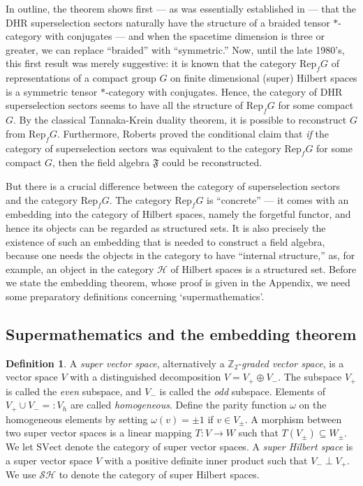 \documentclass[12pt]{article}
\newcommand{\alg}[1]{\mathfrak{#1}}
\theoremstyle{definition}
\theoremstyle{definition}
\newtheorem{defn}[thm]{Definition}
\theoremstyle{remark}
\newcommand{\SVect}{\mathrm{SVect}}
\def\2#1{{\mathcal #1}}
\def\7#1{{\mathbb #1}}
\def\om{\omega} \def\Om{\Omega} \def\dd{\partial} \def\D{\Delta}
\newcommand{\Rep}{\mathrm{Rep}}
\begin{document}
In outline, the theorem shows first --- as was
essentially established in \cite{dhr3} --- that the DHR
superselection sectors naturally have the structure of
a braided tensor $*$-category with conjugates --- and
when the spacetime dimension is three or greater, we
can replace ``braided'' with ``symmetric.''  Now, until
the late 1980's, this first result was merely
suggestive: it is known that the category $\Rep _f G$
of representations of a compact group $G$ on finite
dimensional (super) Hilbert spaces is a symmetric
tensor $*$-category with conjugates.  Hence, the
category of DHR superselection sectors seems to have
all the structure of $\Rep _fG$ for some compact $G$.
By the classical Tannaka-Krein duality theorem, it is
possible to reconstruct $G$ from $\Rep _fG$.
Furthermore, Roberts \cite{problem} proved the
conditional claim that \emph{if} the category of
superselection sectors was equivalent to the category
$\Rep _fG$ for some compact $G$, then the field algebra
$\alg{F}$ could be reconstructed.

But there is a crucial difference between the category of
superselection sectors and the category $\Rep _fG$.  The category
$\Rep _fG$ is ``concrete'' --- it comes with an embedding into the
category of Hilbert spaces, namely the forgetful functor, and hence
its objects can be regarded as structured sets.  It is also precisely
the existence of such an embedding that is needed to construct a field
algebra, because one needs the objects in the category to have
``internal structure,'' as, for example, an object in the category
$\2H$ of Hilbert spaces is a structured set.  Before we state the
embedding theorem, whose proof is given in the Appendix, we need some
preparatory definitions concerning `supermathematics'.

 

\subsection{Supermathematics and the embedding theorem}

\begin{defn} A \emph{super vector space}, alternatively
  a $\7Z_2$-\emph{graded vector space}, is a vector
  space $V$ with a distinguished decomposition
  $V=V_+\oplus V_-$.  The subspace $V_+$ is called the
  \emph{even} subspace, and $V_-$ is called the
  \emph{odd} subspace.  Elements of $V_+\cup V_-=:V_h$
  are called \emph{homogeneous}.  Define the parity
  function $\om$ on the homogeneous elements by setting
  $\om (v)=\pm 1$ if $v\in V_{\pm}$.  A morphism
  between two super vector spaces is a linear mapping
  $T:V\to W$ such that $T(V_\pm )\subseteq W_\pm $.  We
  let $\SVect$ denote the category of super vector
  spaces.  A \emph{super Hilbert space} is a super
  vector space $V$ with a positive definite inner
  product such that $V_-\perp V_+$.  We use $\2S\2H$ to
  denote the category of super Hilbert spaces.
\end{defn}
\end{document}
